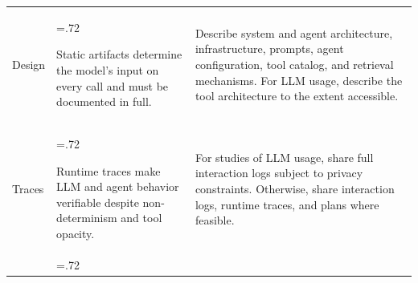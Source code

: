 \documentclass[smallextended]{svjour3}
\newcommand{\must}{\textbf{must}\xspace}
\newcommand{\should}{\textbf{should}\xspace}
\newcommand{\iconM}{\usebox{\iconMbox}\xspace}
\newcommand{\iconS}{\usebox{\iconSbox}\xspace}
\newcommand{\iconM}{●\xspace}
\newcommand{\iconS}{○\xspace}
\newcommand{\llmusage}{\hyperref[sec:studying-llm-usage-in-software-engineering]{\mbox{\emph{Studying LLM Usage}}}\xspace}
\newcommand{\llmusage}{\href{/study-types/usage/}{\emph{Studying LLM Usage}}\xspace}
\begin{document}
\begin{appendices}
\begin{center}
\begin{tabularx}{\textwidth}{@{}>{\raggedright\arraybackslash}p{2.05cm}>{\hsize=.72\hsize\raggedright\arraybackslash}X>{\hsize=1.28\hsize\raggedright\arraybackslash}X@{}}
Design & Static artifacts determine the model's input on every call and must be documented in full. &
\iconM Describe system and agent architecture, infrastructure, prompts, agent configuration, tool catalog, and retrieval mechanisms.
\newline \iconS For LLM usage, describe the tool architecture to the extent accessible. \\
\addlinespace
Traces & Runtime traces make LLM and agent behavior verifiable despite non-determinism and tool opacity. &
\iconM For studies of LLM usage, share full interaction logs subject to privacy constraints.
\newline \iconS Otherwise, share interaction logs, runtime traces, and plans where feasible. \\
\addlinespace

\end{tabularx}
\end{center}
\end{appendices}
\end{document}
